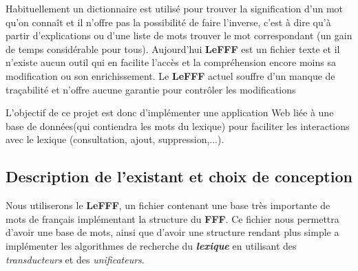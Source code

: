 {Habituellement un dictionnaire est utilisé pour trouver la signification d'un mot qu'on connaît et il n'offre pas la possibilité de faire
 l'inverse, c'est à dire qu'à partir d'explications ou d'une liste de mots trouver le mot correspondant (un gain de temps considérable pour tous).
  Aujourd'hui \textbf{LeFFF} est un fichier texte et il n'existe aucun outil qui en facilite l'accès et la compréhension encore moins sa 
  modification ou son enrichissement. Le \textbf{LeFFF} actuel souffre d'un manque de traçabilité et n'offre aucune garantie pour contrôler 
  les modifications\par}

{L'objectif de ce projet est donc d'implémenter une application Web liée à une base de données(qui contiendra les mots du lexique) pour faciliter 
les interactions avec le lexique (consultation, ajout, suppression,...).\par}


\subsection{Description de l'existant et choix de conception}
{Nous utiliserons le \textbf{LeFFF}, un fichier contenant une base très importante de mots de français implémentant la structure du \textbf{FFF}. 
Ce fichier nous permettra d'avoir une base de mots, ainsi que d'avoir une structure rendant plus simple a implémenter les algorithmes de recherche
 du \textit{\bf lexique} en utilisant des \textit{transducteurs} et des \textit{unificateurs}.\par}